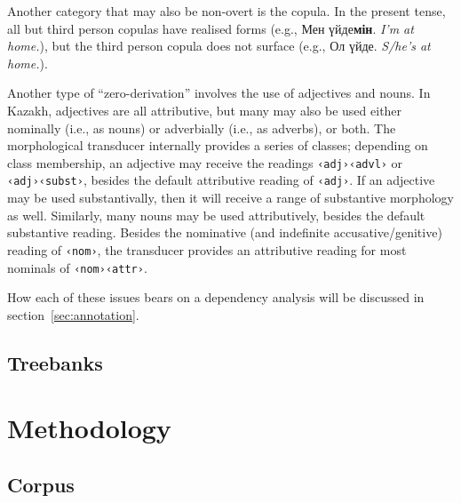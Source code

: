 \documentclass[a4paper,11pt, onecolumn,twoside]{article}
\newcommand{\gloss}[1]{{\em #1}}
\newcommand{\tag}[1]{\texttt{‹#1›}}
\begin{document}
Another category that may also be non-overt is the copula.  In the present tense, all but third person copulas have realised forms (e.g., Мен үйде\textbf{мін}. \gloss{I'm at home.}), but the third person copula does not surface (e.g., Ол үйде. \gloss{S/he's at home.}).

Another type of ``zero-derivation'' involves the use of adjectives and nouns.  In Kazakh, adjectives are all attributive, but many may also be used either nominally (i.e., as nouns) or adverbially (i.e., as adverbs), or both.  The morphological transducer internally provides a series of classes; depending on class membership, an adjective may receive the readings \tag{adj}\tag{advl} or \tag{adj}\tag{subst}, besides the default attributive reading of \tag{adj}.  If an adjective may be used substantivally, then it will receive a range of substantive morphology as well.  Similarly, many nouns may be used attributively, besides the default substantive reading.  Besides the nominative (and indefinite accusative/genitive) reading of \tag{nom}, the transducer provides an attributive reading for most nominals of \tag{nom}\tag{attr}.

How each of these issues bears on a dependency analysis will be discussed in section~\ref{sec:annotation}.


\subsection{Treebanks} %


\section{Methodology}

\subsection{Corpus}
\end{document}
